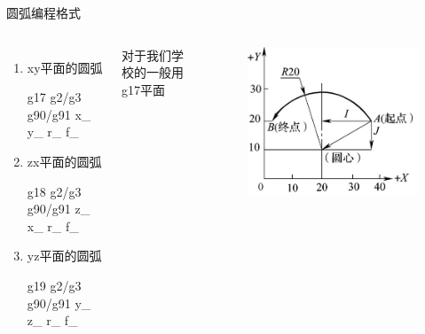 \documentclass[utf8,zihao=-4]{ctexbeamer}
\begin{document}
\begin{frame}{圆弧编程格式}
    \begin{columns}

 \begin{enumerate}
     \item xy平面的圆弧 
   
 g17  g2/g3  g90/g91 x\_ y\_ r\_ f\_
 
 \item zx平面的圆弧 
   
 g18 g2/g3 g90/g91 z\_ x\_ r\_ f\_
 
\item  yz平面的圆弧   
 
 g19 g2/g3 g90/g91 y\_ z\_ r\_ f\_
 
 \end{enumerate}
  对于我们学校的一般用g17平面
        \begin{figure}
            \centering
            \includegraphics[width=1\linewidth]{image/4-3}
            \caption{}
            \label{fig:4-3}
        \end{figure}
        
        
    \end{columns}
\end{frame}
\end{document}
